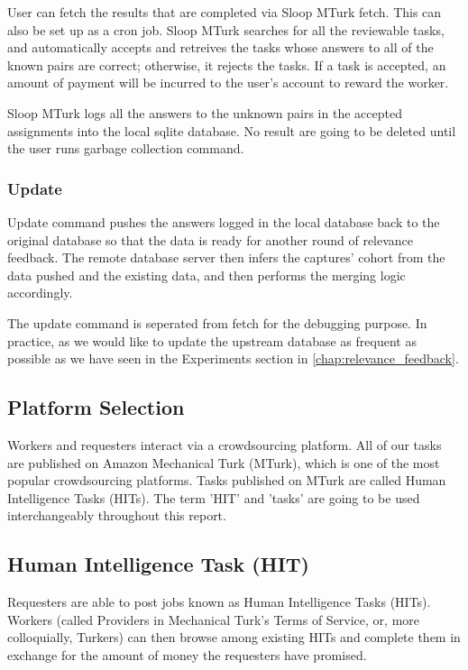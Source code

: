 User can fetch the results that are completed via Sloop MTurk fetch. This can
also be set up as a cron job. Sloop MTurk searches for all the reviewable
tasks, and automatically accepts and retreives the tasks whose answers to all
of the known pairs are correct; otherwise, it rejects the tasks. If a task is
accepted, an amount of payment will be incurred to the user's account to reward
the worker.

Sloop MTurk logs all the answers to the unknown pairs in the accepted
assignments into the local sqlite database. No result are going to be deleted
until the user runs garbage collection command.

\subsubsection{Update}

Update command pushes the answers logged in the local database back to the
original database so that the data is ready for another round of relevance
feedback. The remote database server then infers the captures' cohort from the
data pushed and the existing data, and then performs the merging logic
accordingly\cite{sloopdocs}. 

The update command is seperated from fetch for the debugging purpose. In
practice, as we would like to update the upstream database as frequent as
possible as we have seen in the Experiments section in
\ref{chap:relevance_feedback}.

\subsection{Platform Selection}

Workers and requesters interact via a crowdsourcing platform. All of our tasks
are published on Amazon Mechanical Turk (MTurk), which is one of the most
popular crowdsourcing platforms. Tasks published on MTurk are called Human
Intelligence Tasks (HITs). The term 'HIT' and 'tasks' are going to be used
interchangeably throughout this report.

\subsection{Human Intelligence Task (HIT)}

Requesters are able to post jobs known as Human Intelligence Tasks (HITs).
Workers (called Providers in Mechanical Turk's Terms of Service, or, more
colloquially, Turkers) can then browse among existing HITs and complete them in
exchange for the amount of money the requesters have promised.

